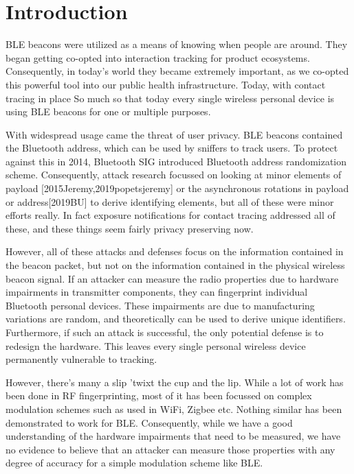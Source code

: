 \section{Introduction}
\label{sec:intro}
BLE beacons were utilized as a means of knowing when people are around. They began getting co-opted into interaction tracking for product ecosystems. Consequently, in today’s world they became extremely important, as we co-opted this powerful tool into our public health infrastructure. Today, with contact tracing in place 
So much so that today every single wireless personal device is using BLE beacons for one or multiple purposes. 

With widespread usage came the threat of user privacy. BLE beacons contained the Bluetooth address, which can be used by sniffers to track users. To protect against this in 2014, Bluetooth SIG introduced Bluetooth address randomization scheme. Consequently, attack research focussed on looking at minor elements of payload [2015Jeremy,2019popetsjeremy] or the asynchronous rotations in payload or address[2019BU] to derive identifying elements, but all of these were minor efforts really. In fact exposure notifications for contact tracing addressed all of these, and these things seem fairly privacy preserving now.

However, all of these attacks and defenses focus on the information contained in the beacon packet, but not on the information contained in the physical wireless beacon signal. If an attacker can measure the radio properties due to hardware impairments in transmitter components, they can fingerprint individual Bluetooth personal devices. These impairments are due to manufacturing variations are random, and theoretically can be used to derive unique identifiers. Furthermore, if such an attack is successful, the only potential defense is to redesign the hardware. This leaves every single personal wireless device permanently vulnerable to tracking.


However, there's many a slip 'twixt the cup and the lip. While a lot of work has been done in RF fingerprinting, most of it has been focussed on complex modulation schemes such as used in WiFi, Zigbee etc. 
%
Nothing similar has been demonstrated to work for BLE.
%
Consequently, while we have a good understanding of the hardware impairments that need to be measured, we have no evidence to believe that an attacker can measure those properties with any degree of accuracy for a simple modulation scheme like BLE.
%


\begin{comment}
It is known that the physical properties of radio hardware impacts the wireless signal. Particularly the manufacturing defects in the radio hardware results in certain variations in signal properties. The area of RF fingerprinting has been extensively studied in literature particularly for complex radios such as WiFi. This begs the question, which is the goal of this paper - Can an attacker utilize RF fingerprinting to actually
\end{comment}
